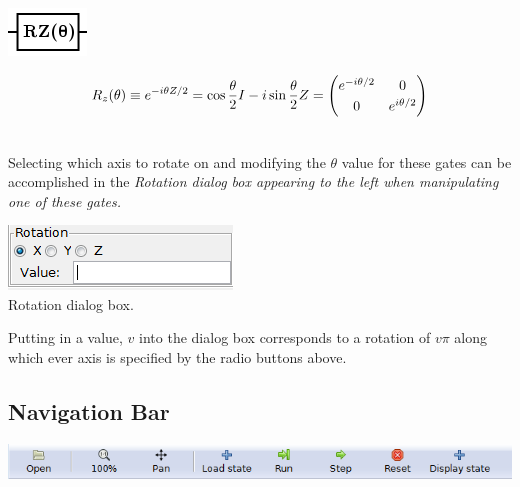 \documentclass[10pt]{article}
\theoremstyle{definition}
\begin{document}
\begin{center}
\includegraphics[scale=.7]{Figures/Gates/RotZGateViewer} 
  \begin{minipage}{.9\linewidth}
    \begin{equation*} \label{mat:RotZ}
    \renewcommand{\arraystretch}{1.25}
R_z(\theta) \equiv e^{-i\theta Z/2} = \cos\frac{\theta}{2} I - i \sin \frac{\theta}{2} Z =  \begin{pmatrix} e^{-i\theta/2} & 0 \\ 0 & e^{i \theta/2}\end{pmatrix}
    \end{equation*}
  \end{minipage}\hspace{-2.5cm}
  \begin{minipage}{.2\linewidth}
  \vspace*{3pt}
    \begin{align}
    \end{align}
  \end{minipage}
\end{center}

Selecting which axis to rotate on and modifying the $\theta$ value for these gates can be accomplished in the \em Rotation \em dialog box appearing to the left when manipulating one of these gates.

\begin{center}
\includegraphics{Figures/Gates/RotationDialog.png}\\
Rotation dialog box.
\end{center}

Putting in a value, $v$ into the dialog box corresponds to a rotation of $v\pi$ along 
which ever axis is specified by the radio buttons above. 

\subsection{Navigation Bar}\label{sub:NavigationBar}

\begin{center}
\includegraphics{Figures/Navigation/NavigationBar.png}
\end{center}
\end{document}
